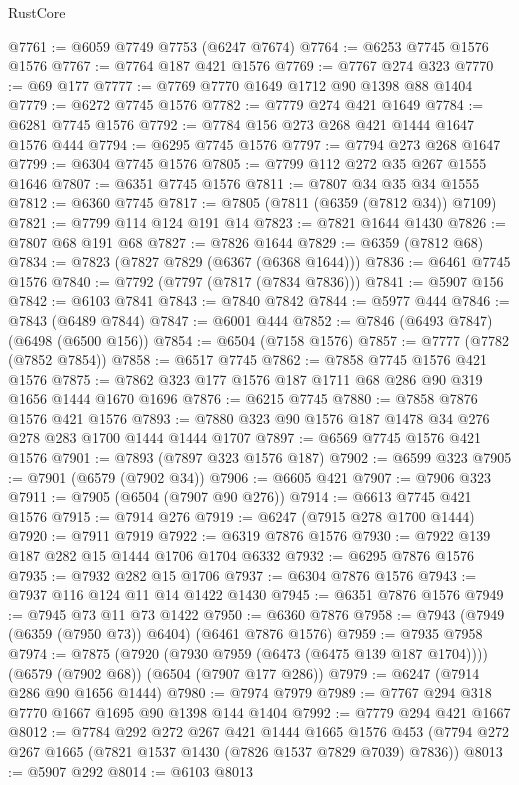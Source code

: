 \begin{lexlean}{RustCore}
\begin{coremodule}
@7761 := @6059 @7749 @7753 (@6247 @7674)
@7764 := @6253 @7745 @1576 @1576
@7767 := @7764 @187 @421 @1576
@7769 := @7767 @274 @323
@7770 := @69 @177
@7777 := @7769 @7770 @1649 @1712 @90 @1398 @88 @1404
@7779 := @6272 @7745 @1576
@7782 := @7779 @274 @421 @1649
@7784 := @6281 @7745 @1576
@7792 := @7784 @156 @273 @268 @421 @1444 @1647 @1576 @444
@7794 := @6295 @7745 @1576
@7797 := @7794 @273 @268 @1647
@7799 := @6304 @7745 @1576
@7805 := @7799 @112 @272 @35 @267 @1555 @1646
@7807 := @6351 @7745 @1576
@7811 := @7807 @34 @35 @34 @1555
@7812 := @6360 @7745
@7817 := @7805 (@7811 (@6359 (@7812 @34)) @7109)
@7821 := @7799 @114 @124 @191 @14
@7823 := @7821 @1644 @1430
@7826 := @7807 @68 @191 @68
@7827 := @7826 @1644
@7829 := @6359 (@7812 @68)
@7834 := @7823 (@7827 @7829 (@6367 (@6368 @1644)))
@7836 := @6461 @7745 @1576
@7840 := @7792 (@7797 (@7817 (@7834 @7836)))
@7841 := @5907 @156
@7842 := @6103 @7841
@7843 := @7840 @7842
@7844 := @5977 @444
@7846 := @7843 (@6489 @7844)
@7847 := @6001 @444
@7852 := @7846 (@6493 @7847) (@6498 (@6500 @156))
@7854 := @6504 (@7158 @1576)
@7857 := @7777 (@7782 (@7852 @7854))
@7858 := @6517 @7745
@7862 := @7858 @7745 @1576 @421 @1576
@7875 := @7862 @323 @177 @1576 @187 @1711 @68 @286 @90 @319 @1656 @1444 @1670 @1696
@7876 := @6215 @7745
@7880 := @7858 @7876 @1576 @421 @1576
@7893 := @7880 @323 @90 @1576 @187 @1478 @34 @276 @278 @283 @1700 @1444 @1444 @1707
@7897 := @6569 @7745 @1576 @421 @1576
@7901 := @7893 (@7897 @323 @1576 @187)
@7902 := @6599 @323
@7905 := @7901 (@6579 (@7902 @34))
@7906 := @6605 @421
@7907 := @7906 @323
@7911 := @7905 (@6504 (@7907 @90 @276))
@7914 := @6613 @7745 @421 @1576
@7915 := @7914 @276
@7919 := @6247 (@7915 @278 @1700 @1444)
@7920 := @7911 @7919
@7922 := @6319 @7876 @1576
@7930 := @7922 @139 @187 @282 @15 @1444 @1706 @1704 @6332
@7932 := @6295 @7876 @1576
@7935 := @7932 @282 @15 @1706
@7937 := @6304 @7876 @1576
@7943 := @7937 @116 @124 @11 @14 @1422 @1430
@7945 := @6351 @7876 @1576
@7949 := @7945 @73 @11 @73 @1422
@7950 := @6360 @7876
@7958 := @7943 (@7949 (@6359 (@7950 @73)) @6404) (@6461 @7876 @1576)
@7959 := @7935 @7958
@7974 := @7875
    (@7920 (@7930 @7959 (@6473 (@6475 @139 @187 @1704))))
    (@6579 (@7902 @68))
    (@6504 (@7907 @177 @286))
@7979 := @6247 (@7914 @286 @90 @1656 @1444)
@7980 := @7974 @7979
@7989 := @7767 @294 @318 @7770 @1667 @1695 @90 @1398 @144 @1404
@7992 := @7779 @294 @421 @1667
@8012 := @7784
    @292
    @272
    @267
    @421
    @1444
    @1665
    @1576
    @453
    (@7794 @272 @267 @1665 (@7821 @1537 @1430 (@7826 @1537 @7829 @7039) @7836))
@8013 := @5907 @292
@8014 := @6103 @8013

\end{coremodule}
\end{lexlean}
